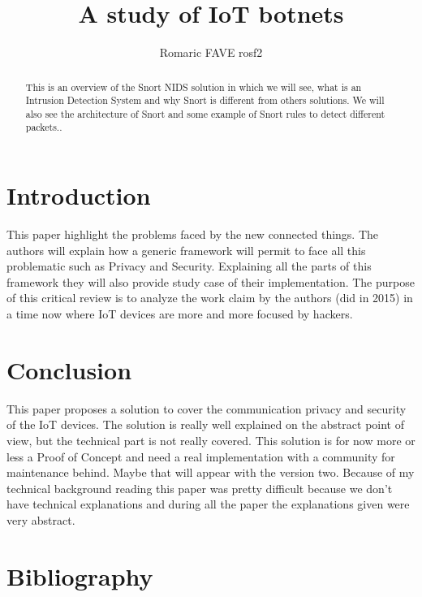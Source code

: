 \documentclass{article}
\begin{document}
\title{A study of IoT botnets}
\author{Romaric FAVE rosf2}

\maketitle
\newpage

\tableofcontents

\begin{abstract}
  This is an overview of the Snort NIDS solution in which we will see, what is an Intrusion Detection System and why Snort is different from others solutions. We will also see the architecture of Snort and some example of Snort rules to detect different packets..
\end{abstract}

\section{Introduction}
This paper highlight the problems faced by the new connected things. The authors will explain how a generic framework will permit to face all this problematic such as Privacy and Security. Explaining all the parts of this framework they will also provide study case of their implementation.\newline
\newline
The purpose of this critical review is to analyze the work claim by the authors (did in 2015) in a time now where IoT devices are more and more focused by hackers\autocite{angrishi2017turning}.

\twocolumn

\onecolumn
\section{Conclusion}
This paper proposes a solution to cover the communication privacy and security of the IoT devices. The solution is really well explained on the abstract point of view, but the technical part is not really covered. This solution is for now more or less a Proof of Concept and need a real implementation with a community for maintenance behind. Maybe that will appear with the version two.\newline
Because of my technical background reading this paper was pretty difficult because we don't have technical explanations and during all the paper the explanations given were very abstract.

\section{Bibliography}
\printbibliography
\end{document}
